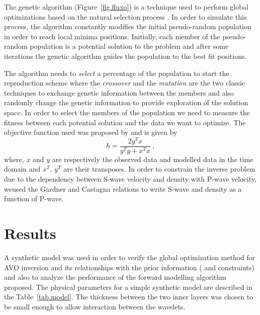 \documentclass{vie16}
\begin{document}
The genetic algorithm (Figure~\ref{fig.fluxo}) is a technique
used to perform global optimizations based on the natural
selection process \citep{Holland1975}. In order to simulate this
process, the algorithm constantly modifies the initial
pseudo-random population in order to reach local minima
positions.  Initially, each member of the pseudo-random
population is a potential solution to the problem and after some
iterations the genetic algorithm guides the population to
the best fit positions.

The algorithm needs to \textit{select} a percentage of the
population to start the reproduction scheme where the
\textit{crossover} and the \textit{mutation} are the two classic
techniques to exchange genetic information between the members
and also randomly change the genetic information to provide
exploration of the solution space. In order to select the
members of the population we need to measure the fitness between
each potential solution and the data we want to optimize. The
objective function used was proposed by \cite{Porsani2000} and
is given by
\begin{equation}
h = \frac{2y^{T} x} {y^{T}y + x^{T}x} \ ,
\label{eq.Porsani}
\end{equation}
where, $x$ and $y$ are respectively the observed data and
modelled data in the time domain and  $x^{T}$, $y^{T}$ are their
transposes. In order to constrain the inverse problem due to the
dependency between S-wave velocity and density with P-wave
velocity, weused the Gardner \citep{Gardner1974} and
Castagna \citep{Castagna1985} relations to write S-wave and
density as a function of P-wave.

\section{Results}
A synthetic model was used in order to verify the global
optimization method for AVO inversion and its relationships with
the prior information (\cite{Gardner1974} and
\cite{Castagna1985} constraints) and also to analyze the
performance of the forward modelling algorithm proposed. The
physical parameters for a simple synthetic model are described
in the Table~\ref{tab.model}. The thickness between the two
inner layers was chosen to be small enough to allow interaction
between the wavelets.
\end{document}
